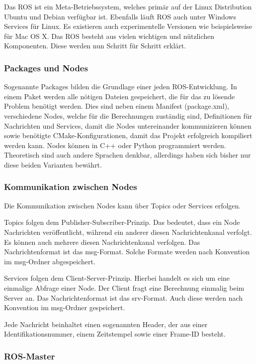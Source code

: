 Das \ac{ROS} ist ein Meta-Betriebssystem, welches primär auf der Linux Distribution Ubuntu und Debian verfügbar ist. Ebenfalls läuft \ac{ROS} auch unter Windows Services für Linux. Es existieren auch experimentelle Versionen wie beispielsweise für Mac OS X. Das \ac{ROS} besteht aus vielen wichtigen und nützlichen Komponenten. Diese werden nun Schritt für Schritt erklärt.

\subsubsection{Packages und Nodes}

Sogenannte Packages bilden die Grundlage einer jeden \ac{ROS}-Entwicklung. In einem Paket werden alle nötigen Dateien gespeichert, die für das zu lösende Problem benötigt werden. Dies sind neben einem Manifest (package.xml), verschiedene Nodes, welche für die Berechnungen zuständig sind, Definitionen für Nachrichten und Services, damit die Nodes untereinander kommunizieren können sowie benötigte CMake-Konfigurationen, damit das Projekt erfolgreich kompiliert werden kann. Nodes können in C++ oder Python programmiert werden. Theoretisch sind auch andere Sprachen denkbar, allerdings haben sich bisher nur diese beiden Varianten bewährt.

\subsubsection{Kommunikation zwischen Nodes}

Die Kommunikation zwischen Nodes kann über Topics oder Services erfolgen.

Topics folgen dem Publisher-Subscriber-Prinzip. Das bedeutet, dass ein Node Nachrichten veröffentlicht, während ein anderer diesen Nachrichtenkanal verfolgt. Es können auch mehrere diesen Nachrichtenkanal verfolgen. Das Nachrichtenformat ist das msg-Format. Solche Formate werden nach Konvention im msg-Ordner abgespeichert.

Services folgen dem Client-Server-Prinzip. Hierbei handelt es sich um eine einmalige Abfrage einer Node. Der Client fragt eine Berechnung einmalig beim Server an. Das Nachrichtenformat ist das srv-Format. Auch diese werden nach Konvention im msg-Ordner gespeichert.
    
Jede Nachricht beinhaltet einen sogenannten Header, der aus einer Identifikationsnummer, einem Zeitstempel sowie einer Frame-ID besteht.

\subsubsection{ROS-Master}

